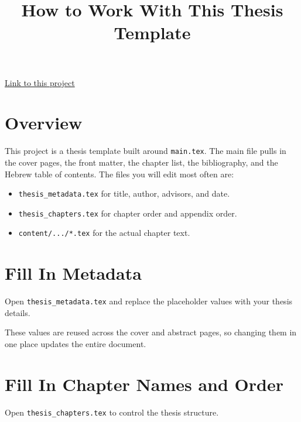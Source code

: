 \documentclass[11pt,a4paper]{article}
\title{How to Work With This Thesis Template}
\author{}
\date{}
\begin{document}
\maketitle

\href{https://www.overleaf.com/read/fxhpwgkznxdx#ca782c}{Link to this project}

\section{Overview}
This project is a thesis template built around \texttt{main.tex}. The main file pulls in the cover pages, the front matter, the chapter list, the bibliography, and the Hebrew table of contents. The files you will edit most often are:
\begin{itemize}[leftmargin=*]
    \item \texttt{thesis\_metadata.tex} for title, author, advisors, and date.
    \item \texttt{thesis\_chapters.tex} for chapter order and appendix order.
    \item \texttt{content/.../*.tex} for the actual chapter text.
\end{itemize}

\section{Fill In Metadata}
Open \texttt{thesis\_metadata.tex} and replace the placeholder values with your thesis details.


These values are reused across the cover and abstract pages, so changing them in one place updates the entire document.

\section{Fill In Chapter Names and Order}
Open \texttt{thesis\_chapters.tex} to control the thesis structure.
\end{document}
